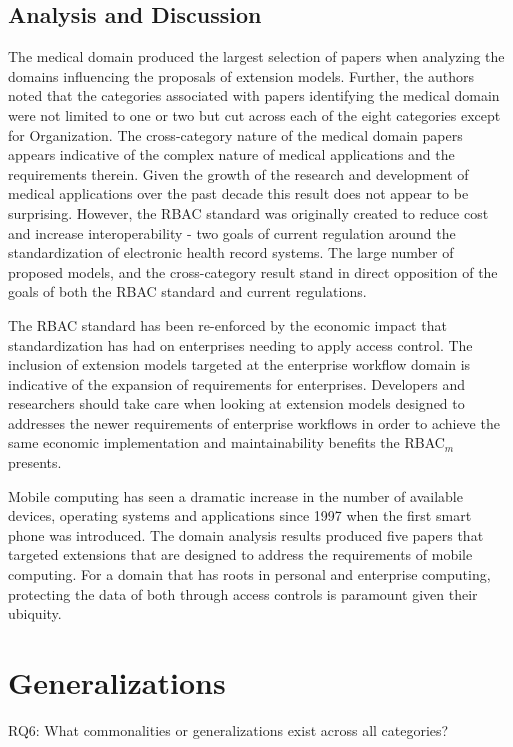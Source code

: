 \subsection{Analysis and Discussion}

The medical domain produced the largest selection of papers when analyzing the domains influencing the proposals of extension models.  
Further, the authors noted that the categories associated with papers identifying the medical domain were not limited to one or two but cut across
each of the eight categories except for Organization. 
The cross-category nature of the medical domain papers appears indicative of the complex nature of medical applications and the requirements therein.
Given the growth of the research and development of medical applications over the past decade this result does not appear to be surprising. However,
the RBAC standard was originally created to reduce cost and increase interoperability - two goals of current regulation around the standardization
of electronic health record systems. The large number of proposed models, and the cross-category result stand in direct opposition of the goals
of both the RBAC standard and current regulations.

The RBAC standard has been re-enforced by the economic impact that standardization has had on enterprises needing to apply access control.  The
inclusion of extension models targeted at the enterprise workflow domain is indicative of the expansion of requirements for enterprises. Developers
and researchers should take care when looking at extension models designed to addresses the newer requirements of enterprise workflows in order to
achieve the same economic implementation and maintainability benefits the RBAC$_{m}$ presents.

Mobile computing has seen a dramatic increase in the number of available devices, operating systems and applications since 1997 when the first smart phone
was introduced. 
The domain analysis results produced five papers that targeted extensions that are designed to address the requirements of mobile computing.
For a domain that has roots in personal and enterprise computing, protecting the data of both through access controls is paramount given their ubiquity.


\section{Generalizations} \label{sec:generalizations}

RQ6: What commonalities or generalizations exist across all categories?

